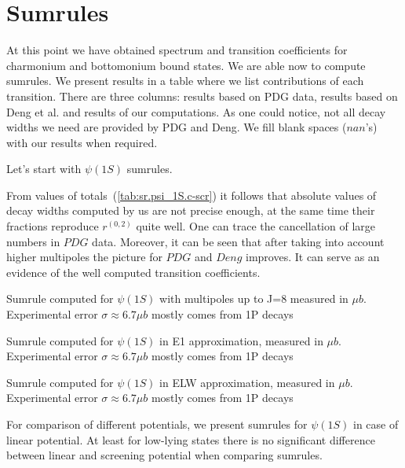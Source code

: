 \chapter{Sumrules}

At this point we have obtained spectrum and transition coefficients for charmonium and bottomonium bound states. We are able now to compute sumrules. We present results in a table where we list contributions of each transition. There are three columns: results based on PDG data, results based on Deng et al. and results of our computations. As one could notice, not all decay widths we need are provided by PDG and Deng. We fill blank spaces ($nan$'s) with our results when required.

Let's start with $\psi(1S)$ sumrules.

From values of totals~(\cref{tab:sr.psi_1S.c-scr}) it follows that absolute values of decay widths computed by us are not precise enough, at the same time their fractions reproduce $r^{(0,2)}$ quite well. One can trace the cancellation of large numbers in $PDG$ data. Moreover, it can be seen that after taking into account higher multipoles the picture for $PDG$ and $Deng$ improves. It can serve as an evidence of the well computed transition coefficients.

\begin{table}
    {\caption{Sumrule computed for $\psi(1S)$ with multipoles up to J=8 measured in $\mu b$. Experimental error $\sigma \approx 6.7 \mu b$ mostly comes from 1P decays \label{tab:sr.psi_1S.c-scr}}}
    
\end{table}

\begin{table}[H]
    {\caption{Sumrule computed for $\psi(1S)$ in E1 approximation, measured in $\mu b$. Experimental error $\sigma \approx 6.7 \mu b$ mostly comes from 1P decays \label{tab:srE1.psi_1S.c-scr}}}
    
\end{table}

\begin{table}[H]
    {\caption{Sumrule computed for $\psi(1S)$ in ELW approximation, measured in $\mu b$. Experimental error $\sigma \approx 6.7 \mu b$ mostly comes from 1P decays \label{tab:srELW.psi_1S.c-scr}}}
    
\end{table}

For comparison of different potentials, we present sumrules for $\psi(1S)$ in case of linear potential. At least for low-lying states there is no significant difference between linear and screening potential when comparing sumrules.

